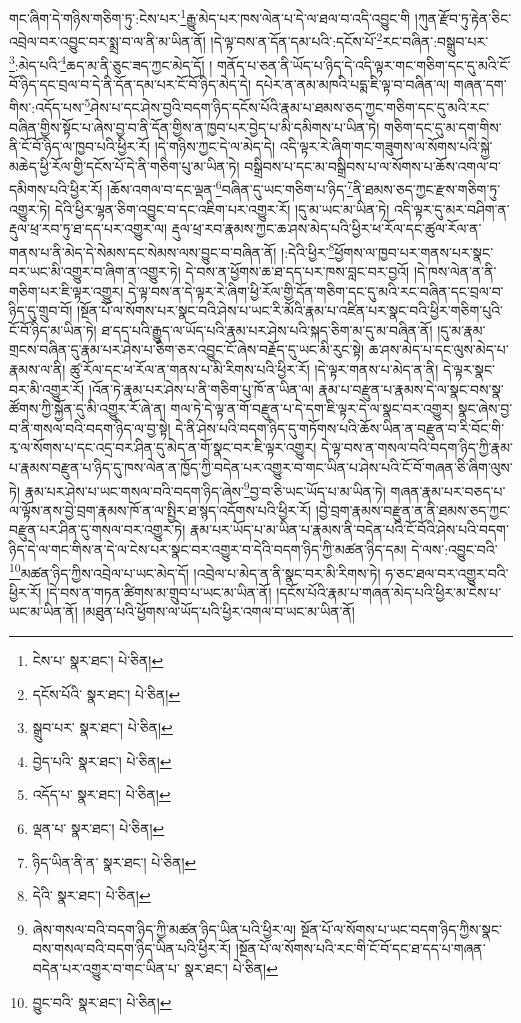 གང་ཞིག་དེ་གཉིས་གཅིག་ཏུ་:ངེས་པར་\footnote{ངེས་པ་  སྣར་ཐང་།  པེ་ཅིན། }རྒྱུ་མེད་པར་ཁས་ལེན་པ་དེ་ལ་ཐལ་བ་འདི་འབྱུང་གི །ཀུན་རྫོབ་ཏུ་རྟེན་ཅིང་འབྲེལ་བར་འབྱུང་བར་སྨྲ་བ་ལ་ནི་མ་ཡིན་ནོ། །དེ་ལྟ་བས་ན་དོན་དམ་པའི་:དངོས་པོ་\footnote{དངོས་པོའི་  སྣར་ཐང་།  པེ་ཅིན། }རང་བཞིན་:བསྒྲུབ་པར་\footnote{སྒྲུབ་པར་  སྣར་ཐང་།  པེ་ཅིན། }:མེད་པའི་\footnote{བྱེད་པའི་  སྣར་ཐང་།  པེ་ཅིན། }ཆད་མ་ནི་ཅུང་ཟད་ཀྱང་མེད་དོ། །
གནོད་པ་ཅན་ནི་ཡོད་པ་ཉིད་དེ་འདི་ལྟར་གང་གཅིག་དང་དུ་མའི་ངོ་བོ་ཉིད་དང་བྲལ་བ་དེ་ནི་དོན་དམ་པར་ངོ་བོ་ཉིད་མེད་དེ། དཔེར་ན་ནམ་མཁའི་པདྨ་ཇི་ལྟ་བ་བཞིན་ལ། གཞན་དག་གིས་:འདོད་པས་\footnote{འདོད་པ་  སྣར་ཐང་།  པེ་ཅིན། }ཤེས་པ་དང་ཤེས་བྱའི་བདག་ཉིད་དངོས་པོའི་རྣམ་པ་ཐམས་ཅད་ཀྱང་གཅིག་དང་དུ་མའི་རང་བཞིན་གྱིས་སྟོང་པ་ཞེས་བྱ་བ་ནི་དོན་གྱིས་ན་ཁྱབ་པར་བྱེད་པ་མི་དམིགས་པ་ཡིན་ཏེ། གཅིག་དང་དུ་མ་དག་གིས་ནི་ངོ་བོ་ཉིད་ལ་ཁྱབ་པའི་ཕྱིར་རོ། །དེ་གཉིས་ཀྱང་དེ་ལ་མེད་དེ། འདི་ལྟར་རེ་ཞིག་གང་གཟུགས་ལ་སོགས་པའི་སྐྱེ་མཆེད་ཕྱི་རོལ་གྱི་དངོས་པོ་དེ་ནི་གཅིག་པུ་མ་ཡིན་ཏེ། བསྒྲིབས་པ་དང་མ་བསྒྲིབས་པ་ལ་སོགས་པ་ཆོས་འགལ་བ་དམིགས་པའི་ཕྱིར་རོ། །ཆོས་འགལ་བ་དང་ལྡན་\footnote{ལྡན་པ་  སྣར་ཐང་།  པེ་ཅིན། }བཞིན་དུ་ཡང་གཅིག་པ་ཉིད་\footnote{ཉིད་ཡིན་ནི་ན་  སྣར་ཐང་།  པེ་ཅིན། }ནི་ཐམས་ཅད་ཀྱང་རྫས་གཅིག་ཏུ་འགྱུར་ཏེ། དེའི་ཕྱིར་ལྷན་ཅིག་འབྱུང་བ་དང་འཇིག་པར་འགྱུར་རོ། །དུ་མ་ཡང་མ་ཡིན་ཏེ། འདི་ལྟར་དུ་མར་བཤིག་ན་རྡུལ་ཕྲ་རབ་ཏུ་ཐ་དད་པར་འགྱུར་ལ། རྡུལ་ཕྲ་རབ་རྣམས་ཀྱང་ཆ་ཤས་མེད་པའི་ཕྱིར་ཕ་རོལ་དང་ཚུལ་རོལ་ན་གནས་པ་ནི་མེད་དེ་སེམས་དང་སེམས་ལས་བྱུང་བ་བཞིན་ནོ། །:དེའི་ཕྱིར་\footnote{དེའི་  སྣར་ཐང་།  པེ་ཅིན། }ཕྱོགས་ལ་ཁྱབ་པར་གནས་པར་སྣང་བར་ཡང་མི་འགྱུར་བ་ཞིག་ན་འགྱུར་ཏེ། དེ་བས་ན་ཕྱོགས་ཆ་ཐ་དད་པར་ཁས་བླང་བར་བྱའོ། །དེ་ཁས་ལེན་ན་ནི་གཅིག་པར་ཇི་ལྟར་འགྱུར། དེ་ལྟ་བས་ན་དེ་ལྟར་རེ་ཞིག་ཕྱི་རོལ་གྱི་དོན་གཅིག་དང་དུ་མའི་རང་བཞིན་དང་བྲལ་བ་ཉིད་དུ་གྲུབ་བོ། །སྔོན་པོ་ལ་སོགས་པར་སྣང་བའི་ཤེས་པ་ཡང་རི་མོའི་རྣམ་པ་འཛིན་པར་སྣང་བའི་ཕྱིར་གཅིག་པུའི་ངོ་བོ་ཉིད་མ་ཡིན་ཏེ། ཐ་དད་པའི་རྒྱུད་ལ་ཡོད་པའི་རྣམ་པར་ཤེས་པའི་སྐད་ཅིག་མ་དུ་མ་བཞིན་ནོ། །དུ་མ་རྣམ་གྲངས་བཞིན་དུ་རྣམ་པར་ཤེས་པ་ཅིག་ཅར་འབྱུང་ངོ་ཞེས་བརྗོད་དུ་ཡང་མི་རུང་སྟེ། ཆ་ཤས་མེད་པ་དང་ལུས་མེད་པ་རྣམས་ལ་ནི། ཚུ་རོལ་དང་ཕ་རོལ་ན་གནས་པ་མི་རིགས་པའི་ཕྱིར་རོ། །དེ་ལྟར་གནས་པ་མེད་ན་ནི། དེ་ལྟར་སྣང་བར་མི་འགྱུར་རོ། །འོན་ཏེ་རྣམ་པར་ཤེས་པ་ནི་གཅིག་པུ་ཁོ་ན་ཡིན་ལ། རྣམ་པ་བརྫུན་པ་རྣམས་དེ་ལ་སྣང་བས་སྣ་ཚོགས་ཀྱི་སྐྱོན་དུ་མི་འགྱུར་རོ་ཞེ་ན། གལ་ཏེ་དེ་ལྟ་ན་གོ་བརྫུན་པ་དེ་དག་ཇི་ལྟར་དེ་ལ་སྣང་བར་འགྱུར། སྣང་ཞེས་བྱ་བ་ནི་གསལ་བའི་བདག་ཉིད་ལ་བྱ་སྟེ། དེ་ནི་ཤེས་པའི་བདག་ཉིད་དུ་གཏོགས་པའི་ཆོས་ཡིན་ན་བརྫུན་བ་རི་བོང་གི་རྭ་ལ་སོགས་པ་དང་འདྲ་བར་ཤིན་དུ་མེད་ན་གོ་སྣང་བར་ཇི་ལྟར་འགྱུར། དེ་ལྟ་བས་ན་གསལ་བའི་བདག་ཉིད་ཀྱི་རྣམ་པ་རྣམས་བརྫུན་པ་ཉིད་དུ་ཁས་ལེན་ན་ཁྱོད་ཀྱི་བདེན་པར་འགྱུར་བ་གང་ཡིན་པ་ཤེས་པའི་ངོ་བོ་གཞན་ཅི་ཞིག་ལུས་ཏེ། རྣམ་པར་ཤེས་པ་ཡང་གསལ་བའི་བདག་ཉིད་ཞེས་\footnote{ཞེས་གསལ་བའི་བདག་ཉིད་ཀྱི་མཚན་ཉིད་ཡིན་པའི་ཕྱིར་ལ། སྔོན་པོ་ལ་སོགས་པ་ཡང་བདག་ཉིད་ཀྱིས་སྣང་བས་གསལ་བའི་བདག་ཉིད་ཡིན་པའི་ཕྱིར་རོ། །སྔོན་པོ་ལ་སོགས་པའི་རང་གི་ངོ་བོ་དང་ཐ་དད་པ་གཞན་བདེན་པར་འགྱུར་བ་གང་ཡིན་པ་  སྣར་ཐང་།  པེ་ཅིན། }བྱ་བ་ཅི་ཡང་ཡོད་པ་མ་ཡིན་ཏེ། གཞན་རྣམ་པར་བཅད་པ་ལ་ལྟོས་ནས་བྱེ་བྲག་རྣམས་ཁོ་ན་ལ་སྤྱིར་ཐ་སྙད་འདོགས་པའི་ཕྱིར་རོ། །བྱེ་བྲག་རྣམས་བརྫུན་ན་ནི་ཐམས་ཅད་ཀྱང་བརྫུན་པར་ཤིན་དུ་གསལ་བར་འགྱུར་ཏེ། རྣམ་པར་ཡོད་པ་མ་ཡིན་པ་རྣམས་ནི་བདེན་པའི་ངོ་བོའི་ཤེས་པའི་བདག་ཉིད་དེ་ལ་གང་གིས་ན་དེ་ལ་ངེས་པར་སྣང་བར་འགྱུར་བ་དེའི་བདག་ཉིད་ཀྱི་མཚན་ཉིད་དམ། དེ་ལས་:འབྱུང་བའི་\footnote{བྱུང་བའི་  སྣར་ཐང་།  པེ་ཅིན། }མཚན་ཉིད་ཀྱིས་འབྲེལ་པ་ཡང་མེད་དོ། །འབྲེལ་པ་མེད་ན་ནི་སྣང་བར་མི་རིགས་ཏེ། ཧ་ཅང་ཐལ་བར་འགྱུར་བའི་ཕྱིར་རོ། །དེ་བས་ན་གཏན་ཚིགས་མ་གྲུབ་པ་ཡང་མ་ཡིན་ནོ། །དངོས་པོའི་རྣམ་པ་གཞན་མེད་པའི་ཕྱིར་མ་ངེས་པ་ཡང་མ་ཡིན་ནོ། །མཐུན་པའི་ཕྱོགས་ལ་ཡོད་པའི་ཕྱིར་འགལ་བ་ཡང་མ་ཡིན་ནོ། 